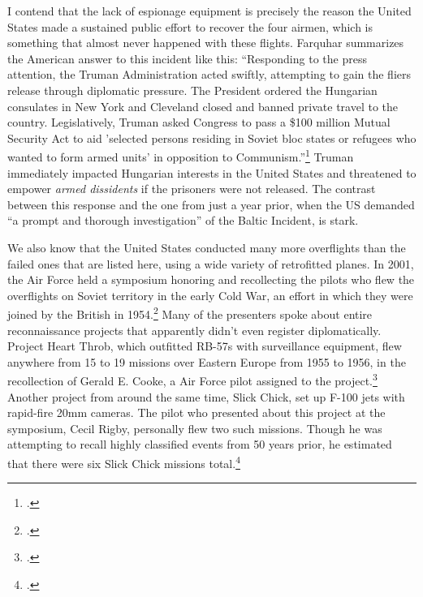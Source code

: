 \documentclass{report}
\begin{document}
\begin{refsegment}
I contend that the lack of espionage equipment is precisely the reason the United States made a sustained public effort to recover the four airmen, which is something that almost never happened with these flights. Farquhar summarizes the American answer to this incident like this: ``Responding to the press attention, the Truman Administration acted swiftly, attempting to gain the fliers release through diplomatic pressure. The President ordered the Hungarian consulates in New York and Cleveland closed and banned private travel to the country. Legislatively, Truman asked Congress to pass a \$100 million Mutual Security Act to aid 'selected persons residing in Soviet bloc states or refugees who wanted to form armed units' in opposition to Communism.''\footcite[p.~43]{farquhar_aerial_2015} Truman immediately impacted Hungarian interests in the United States and threatened to empower \emph{armed dissidents} if the prisoners were not released. The contrast between this response and the one from just a year prior, when the US demanded ``a prompt and thorough investigation'' of the Baltic Incident, is stark.

We also know that the United States conducted many more overflights than the failed ones that are listed here, using a wide variety of retrofitted planes. In 2001, the Air Force held a symposium honoring and recollecting the pilots who flew the overflights on Soviet territory in the early Cold War, an effort in which they were joined by the British in 1954.\footcite[p.~v]{hall_early_2003} Many of the presenters spoke about entire reconnaissance projects that apparently didn't even register diplomatically. Project Heart Throb, which outfitted RB-57s with surveillance equipment, flew anywhere from 15 to 19 missions over Eastern Europe from 1955 to 1956, in the recollection of Gerald E. Cooke, a Air Force pilot assigned to the project.\footcite[p.~194]{hall_early_2003} Another project from around the same time, Slick Chick, set up F-100 jets with rapid-fire 20mm cameras. The pilot who presented about this project at the symposium, Cecil Rigby, personally flew two such missions. Though he was attempting to recall highly classified events from 50 years prior, he estimated that there were six Slick Chick missions total.\footcite[p.~176]{hall_early_2003}


\end{refsegment}
\end{document}
